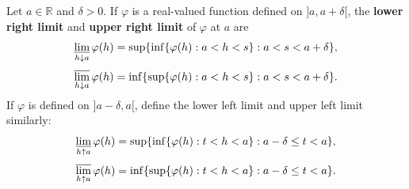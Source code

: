 Let $a \in \mathbb{R}$ and $\delta > 0$. If $\varphi$ is a real-valued function defined on $]a, a+\delta[$, the \textbf{lower right limit} and \textbf{upper right limit} of $\varphi$ at $a$ are
$$\varliminf_{h \downarrow a} \varphi(h) = \sup\{\inf\{\varphi(h) : a < h < s\} : a < s < a+\delta\},$$
$$\varlimsup_{h \downarrow a} \varphi(h) = \inf\{\sup\{\varphi(h) : a < h < s\} : a < s < a+\delta\}.$$
If $\varphi$ is defined on $]a-\delta, a[$, define the lower left limit and upper left limit similarly:
$$\varliminf_{h \uparrow a} \varphi(h) = \sup\{\inf\{\varphi(h) : t < h < a\} : a-\delta \leq t < a\},$$
$$\varlimsup_{h \uparrow a} \varphi(h) = \inf\{\sup\{\varphi(h) : t < h < a\} : a-\delta \leq t < a\}.$$
